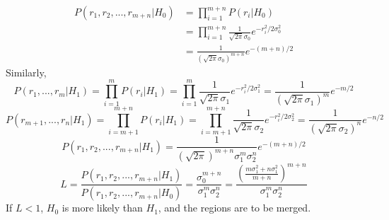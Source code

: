 \documentclass[12pt]{article}
\begin{document}
\begin{equation*}
\begin{aligned}
P\left ( r_1, r_2,...,r_{m+n}|H_0 \right )&=\prod^{m+n}_{i=1}P(r_i|H_0)\\
&=\prod^{m+n}_{i=1}\frac{1}{\sqrt{2\pi}\sigma_0}e^{-r_i^2/2\sigma_0^2}\\
&=\frac{1}{(\sqrt{2\pi}\sigma_0)^{m+n}}e^{-(m+n)/2}
\end{aligned}
\end{equation*}
Similarly,
\begin{equation*}
P\left ( r_1,...,r_m|H_1 \right )=\prod^m_{i=1}P(r_i|H_1)
=\prod^m_{i=1}\frac{1}{\sqrt{2\pi}\sigma_1}e^{-r_i^2/2\sigma_1^2}
=\frac{1}{(\sqrt{2\pi}\sigma_1)^m}e^{-m/2}
\end{equation*}
\begin{equation*}
P\left ( r_{m+1}, ...,r_n|H_1 \right )=\prod^{m+n}_{i=m+1}P(r_i|H_1)
=\prod^{m+n}_{i=m+1}\frac{1}{\sqrt{2\pi}\sigma_2}e^{-r_i^2/2\sigma_2^2}
=\frac{1}{(\sqrt{2\pi}\sigma_2)^n}e^{-n/2}
\end{equation*}
\begin{equation*}
P\left (r_1, r_2,...,r_{m+n}|H_1 \right )=\frac{1}{(\sqrt{2\pi})^{m+n}\sigma_1^m\sigma_2^n}e^{-(m+n)/2}
\end{equation*}
\begin{equation*}
L = \frac{P\left (r_1, r_2,...,r_{m+n}|H_1 \right)}{P\left (r_1, r_2,...,r_{m+n}|H_0 \right )}=\frac{\sigma_0^{m+n}}{\sigma_1^m\sigma_2^n}
=\frac{\left ( \frac{m\sigma_1^2+n\sigma_1^2}{m+n}\right )^{m+n}}{\sigma_1^m\sigma_2^n}
\end{equation*}
If $L < 1$, $H_0$ is more likely than $H_1$, and the regions are to be merged.
\end{document}
